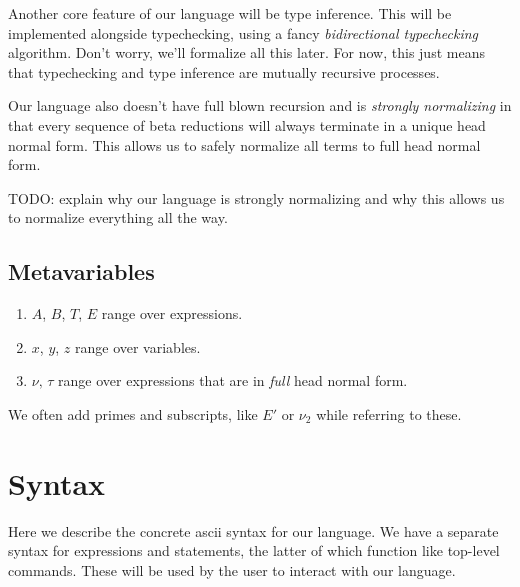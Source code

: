 \documentclass{article}
\begin{document}
Another core feature of our language will be type inference.
This will be implemented alongside typechecking, using a fancy
\textit{bidirectional typechecking} algorithm. Don't worry, we'll formalize all
this later. For now, this just means that typechecking and type inference are
mutually recursive processes.

Our language also doesn't have full blown recursion and is
\textit{strongly normalizing} in that every sequence of beta reductions will
always terminate in a unique head normal form. This allows us to safely
normalize all terms to full head normal form.

TODO: explain why our language is strongly normalizing and why this allows us to
normalize everything all the way.

\subsection{Metavariables}
\begin{enumerate}
\item $A$, $B$, $T$, $E$ range over expressions. 
\item $x$, $y$, $z$ range over variables. 
\item $\nu, \, \tau$ range over expressions that are in \textit{full} head normal
  form.
  \begin{comment}
    We define this set of expressions inductively via:
    \[ \begin{prooftree} \infer0{\Type} \end{prooftree} \]
    \[ \begin{prooftree} \infer0{x} \end{prooftree} \]
    \[ \begin{prooftree} \hypo{\nu} \infer1{x} \end{prooftree} \]
    \[ \begin{prooftree}
        \hypo{x}
        \hypo{\tau}
        \hypo{\tau'}
        \infer3{\Pi_{x : \tau} \tau'}
      \end{prooftree} \]
    \[ \begin{prooftree} \infer0{\Type} \end{prooftree} \]
  \end{comment}
\end{enumerate}

We often add primes and subscripts, like $E'$ or $\nu_2$ while referring to these.

\section{Syntax}
Here we describe the concrete ascii syntax for our language.
We have a separate syntax for expressions and statements, the latter of which
function like top-level commands. These will be used by the user to interact
with our language.
\end{document}
